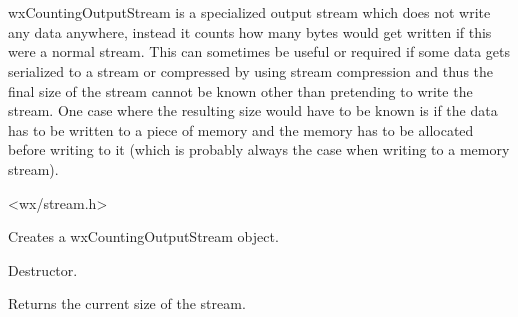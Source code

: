 \section{}\label{wxcountingoutputstream}

wxCountingOutputStream is a specialized output stream which does not write any data anywhere,
instead it counts how many bytes would get written if this were a normal stream. This
can sometimes be useful or required if some data gets serialized to a stream or compressed
by using stream compression and thus the final size of the stream cannot be known other
than pretending to write the stream. One case where the resulting size would have to be
known is if the data has to be written to a piece of memory and the memory has to be
allocated before writing to it (which is probably always the case when writing to a 
memory stream).




<wx/stream.h>


\label{wxcountingoutputstreamctor}


Creates a wxCountingOutputStream object.

\label{wxcountingoutputstreamdtor}


Destructor.

\label{wxcountingoutputstreamgetsize}


Returns the current size of the stream.

